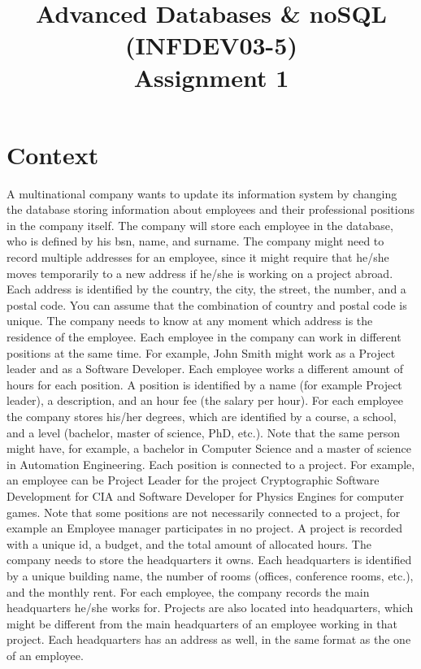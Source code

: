 \documentclass[10pt,a4paper]{article}
\title{Advanced Databases \& noSQL (INFDEV03-5) \\ Assignment 1}
\author { }
\date { }
\begin{document}
\maketitle

\section*{Context}
A multinational company wants to update its information system by changing the database storing information about employees and their professional positions in the company itself. 
The company will store each employee in the database, who is defined by his bsn, name, and surname. 
The company might need to record multiple addresses for an employee, since it might require that he/she moves temporarily to a new address if he/she is working on a project abroad. Each address is identified by the country, the city, the street, the number, and a postal code. You can assume that the combination of country and postal code is unique. The company needs to know at any moment which address is the residence of the employee.
Each employee in the company can work in different positions at the same time. For example, John Smith might work as a Project leader and as a Software Developer. Each employee works a different amount of hours for each position. A position is identified by a name (for example Project leader), a description, and an hour fee (the salary per hour).
For each employee the company stores his/her degrees, which are identified by a course, a school, and a level (bachelor, master of science, PhD, etc.). Note that the same person might have, for example, a bachelor in Computer Science and a master of science in Automation Engineering.
Each position is connected to a project. For example, an employee can be Project Leader for the project Cryptographic Software Development for CIA and Software Developer for Physics Engines for computer games. Note that some positions are not necessarily connected to a project, for example an Employee manager participates in no project. A project is recorded with a unique id, a budget, and the total amount of allocated hours.
The company needs to store the headquarters it owns. Each headquarters is identified by a unique building name, the number of rooms (offices, conference rooms, etc.), and the monthly rent. For each employee, the company records the main headquarters he/she works for. Projects are also located into headquarters, which might be different from the main headquarters of an employee working in that project. Each headquarters has an address as well, in the same format as the one of an employee.
\end{document}
